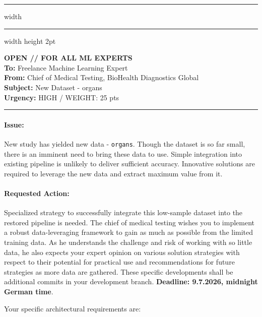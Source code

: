 \documentclass[11pt,a4paper]{article}
\begin{document}
\vspace{0.4cm}
\hrule width \hsize \kern 1mm \hrule width \hsize height 2pt 

\vspace{0.3cm}

\noindent \textbf{OPEN // FOR ALL ML EXPERTS} \\
\textbf{To:} Freelance Machine Learning Expert \\
\textbf{From:} Chief of Medical Testing, BioHealth Diagnostics Global \\
\textbf{Subject:} New Dataset - organs \\
\textbf{Urgency:} HIGH / WEIGHT: 25 pts

\vspace{0.4cm}
\hrule

\paragraph{Issue:}
New study has yielded new data - \texttt{organs}. Though the dataset is so far small, there is an imminent need to bring these data to use. Simple integration into existing pipeline is unlikely to deliver sufficient accuracy. Innovative solutions are required to leverage the new data and extract maximum value from it.

\vspace{-0.4cm}
\paragraph{Requested Action:}
Specialized strategy to successfully integrate this low-sample dataset into the restored pipeline is needed. The chief of medical testing wishes you to implement a robust data-leveraging framework to gain as much as possible from the limited training data. As he understands the challenge and risk of working with so little data, he also expects your expert opinion on various solution strategies with respect to their potential for practical use and recommendations for future strategies as more data are gathered. These specific developments shall be additional commits in your development branch. \textbf{Deadline: 9.7.2026, midnight German time}. 

Your specific architectural requirements are:
\end{document}

